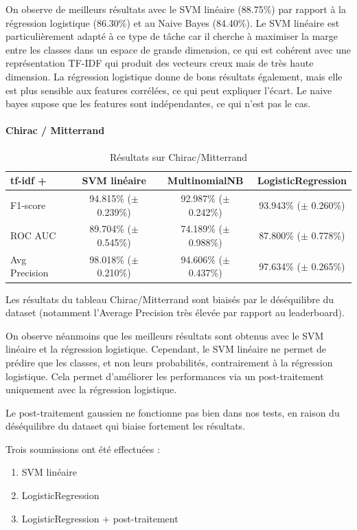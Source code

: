 \documentclass{article}
\begin{document}
On observe de meilleurs résultats avec le SVM linéaire (88.75\%) par rapport à la régression logistique (86.30\%) et au Naive Bayes (84.40\%). Le SVM linéaire est particulièrement adapté à ce type de tâche car il cherche à maximiser la marge entre les classes dans un espace de grande dimension, ce qui est cohérent avec une représentation TF-IDF qui produit des vecteurs creux mais de très haute dimension. La régression logistique donne de bons résultats également, mais elle est plus sensible aux features corrélées, ce qui peut expliquer l'écart. Le naive bayes supose que les features sont indépendantes, ce qui n'est pas le cas.

\paragraph{Chirac / Mitterrand}

\begin{table}[h]
\centering
\begin{tabular}{lccc}
\toprule
tf-idf + & SVM linéaire & MultinomialNB & LogisticRegression \\
\midrule
F1-score       & 94.815\% ($\pm$ 0.239\%) & 92.987\% ($\pm$ 0.242\%) & 93.943\% ($\pm$ 0.260\%) \\
ROC AUC        & 89.704\% ($\pm$ 0.545\%) & 74.189\% ($\pm$ 0.988\%) & 87.800\% ($\pm$ 0.778\%) \\
Avg Precision  & 98.018\% ($\pm$ 0.210\%) & 94.606\% ($\pm$ 0.437\%) & 97.634\% ($\pm$ 0.265\%) \\
\bottomrule
\end{tabular}
\caption{Résultats sur Chirac/Mitterrand}
\end{table}

Les résultats du tableau Chirac/Mitterrand sont biaisés par le déséquilibre du dataset (notamment l'Average Precision très élevée par rapport au leaderboard).

On observe néanmoins que les meilleurs résultats sont obtenus avec le SVM linéaire et la régression logistique. Cependant, le SVM linéaire ne permet de prédire que les classes, et non leurs probabilités, contrairement à la régression logistique. Cela permet d'améliorer les performances via un post-traitement uniquement avec la régression logistique.

Le post-traitement gaussien ne fonctionne pas bien dans nos tests, en raison du déséquilibre du dataset qui biaise fortement les résultats.

Trois soumissions ont été effectuées :
\begin{enumerate}
    \item SVM linéaire
    \item LogisticRegression
    \item LogisticRegression + post-traitement
\end{enumerate}
\end{document}
